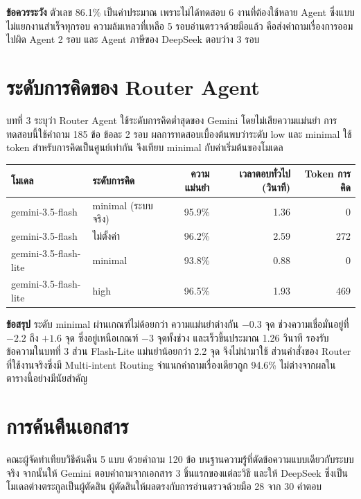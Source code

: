 \documentclass[12pt,a4paper]{article}
\begin{document}
\begin{takeaway}
\textbf{ข้อควรระวัง} \quad ตัวเลข 86.1\% เป็นค่าประมาณ เพราะไม่ได้ทดสอบ 6 งานที่ต้องใช้หลาย Agent ซึ่งแบบไม่แยกงานสำเร็จทุกรอบ ความล้มเหลวที่เหลือ 5 รอบอ่านตรวจด้วยมือแล้ว คือส่งคำถามเรื่องการออมไปผิด Agent 2 รอบ และ Agent ภาษีของ DeepSeek ตอบว่าง 3 รอบ
\end{takeaway}

\section{ระดับการคิดของ Router Agent}

บทที่ 3 ระบุว่า Router Agent ใช้ระดับการคิดต่ำสุดของ Gemini โดยไม่เสียความแม่นยำ การทดสอบนี้ใช้คำถาม 185 ข้อ ข้อละ 2 รอบ ผลการทดสอบเบื้องต้นพบว่าระดับ low และ minimal ใช้ token สำหรับการคิดเป็นศูนย์เท่ากัน จึงเทียบ minimal กับค่าเริ่มต้นของโมเดล

\begin{table}[H]
\centering
\small
\begin{tabular}{llrrr}
\toprule
\textbf{โมเดล} & \textbf{ระดับการคิด} & \textbf{ความแม่นยำ} & \textbf{เวลาตอบทั่วไป (วินาที)} & \textbf{Token การคิด} \\
\midrule
gemini-3.5-flash & minimal (ระบบจริง) & 95.9\% & 1.36 & 0 \\
gemini-3.5-flash & ไม่ตั้งค่า & 96.2\% & 2.59 & 272 \\
gemini-3.5-flash-lite & minimal & 93.8\% & 0.88 & 0 \\
gemini-3.5-flash-lite & high & 96.5\% & 1.93 & 469 \\
\bottomrule
\end{tabular}
\end{table}

\begin{takeaway}
\textbf{ข้อสรุป} \quad ระดับ minimal ผ่านเกณฑ์ไม่ด้อยกว่า ความแม่นยำต่างกัน $-0.3$ จุด ช่วงความเชื่อมั่นอยู่ที่ $-2.2$ ถึง $+1.6$ จุด ซึ่งอยู่เหนือเกณฑ์ $-3$ จุดทั้งช่วง และเร็วขึ้นประมาณ 1.26 วินาที รองรับข้อความในบทที่ 3 ส่วน Flash-Lite แม่นยำน้อยกว่า 2.2 จุด จึงไม่นำมาใช้ ส่วนคำสั่งของ Router ที่ใช้งานจริงซึ่งมี Multi-intent Routing จำแนกคำถามเรื่องเดียวถูก 94.6\% ไม่ต่างจากผลในตารางนี้อย่างมีนัยสำคัญ
\end{takeaway}

\section{การค้นคืนเอกสาร}

คณะผู้จัดทำเทียบวิธีค้นคืน 5 แบบ ด้วยคำถาม 120 ข้อ บนฐานความรู้ที่ตัดข้อความแบบเดียวกับระบบจริง จากนั้นให้ Gemini ตอบคำถามจากเอกสาร 3 ชิ้นแรกของแต่ละวิธี และให้ DeepSeek ซึ่งเป็นโมเดลต่างตระกูลเป็นผู้ตัดสิน ผู้ตัดสินให้ผลตรงกับการอ่านตรวจด้วยมือ 28 จาก 30 คำตอบ
\end{document}
